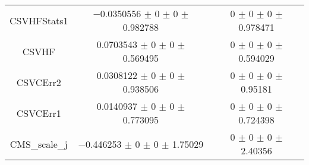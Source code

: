 \begin{table}
\begin{tabular}{ccc}
CSVHFStats1 & \num{-0.0350556} $\pm$ \num{0} $\pm$ \num{0} $\pm$ \num{0.982788} & \num{0} $\pm$ \num{0} $\pm$ \num{0} $\pm$ \num{0.978471}\\
CSVHF & \num{0.0703543} $\pm$ \num{0} $\pm$ \num{0} $\pm$ \num{0.569495} & \num{0} $\pm$ \num{0} $\pm$ \num{0} $\pm$ \num{0.594029}\\
CSVCErr2 & \num{0.0308122} $\pm$ \num{0} $\pm$ \num{0} $\pm$ \num{0.938506} & \num{0} $\pm$ \num{0} $\pm$ \num{0} $\pm$ \num{0.95181}\\
CSVCErr1 & \num{0.0140937} $\pm$ \num{0} $\pm$ \num{0} $\pm$ \num{0.773095} & \num{0} $\pm$ \num{0} $\pm$ \num{0} $\pm$ \num{0.724398}\\
CMS\_scale\_j & \num{-0.446253} $\pm$ \num{0} $\pm$ \num{0} $\pm$ \num{1.75029} & \num{0} $\pm$ \num{0} $\pm$ \num{0} $\pm$ \num{2.40356}\\
\bottomrule
\end{tabular}
\end{table}